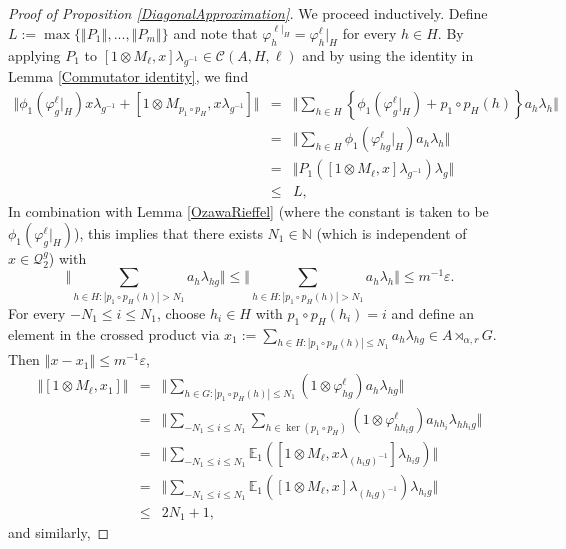 \documentclass[a4paper,11pt,reqno]{amsart}
\numberwithin{equation}{section}
\numberwithin{equation}{section}
\theoremstyle{definition}
\theoremstyle{remark}
\theoremstyle{remark}
\begin{document}
\begin{proof}[{Proof of Proposition \ref{DiagonalApproximation}}]
We proceed inductively. Define $L:=\max\{\left\Vert P_{1}\right\Vert ,...,\left\Vert P_{m}\right\Vert \}$
and note that $\varphi_{h}^{\ell|_{H}}=\varphi_{h}^{\ell}|_{H}$ for
every $h\in H$. By applying $P_{1}$ to $[1\otimes M_{\ell},x]\lambda_{g^{-1}}\in\mathcal{C}(A,H,\ell)$
and by using the identity in Lemma \ref{Commutator identity}, we
find 
\begin{eqnarray}
\nonumber
\Vert\phi_{1}(\varphi_{g}^{\ell}|_{H})x\lambda_{g^{-1}}+[1\otimes M_{p_{1}\circ p_{H}},x\lambda_{g^{-1}}]\Vert &=&  \Vert\sum_{h\in H}\left\{ \phi_{1}(\varphi_{g}^{\ell}|_{H})+p_{1}\circ p_{H}(h)\right\} a_{h}\lambda_{h}\Vert \\
\nonumber
&=& \Vert\sum_{h\in H}\phi_{1}(\varphi_{hg}^{\ell}|_{H})a_{h}\lambda_{h}\Vert \\
\nonumber
&=&   \Vert P_{1}([1\otimes M_{\ell},x]\lambda_{g^{-1}})\lambda_{g}\Vert \\
\nonumber
&\leq&  L,
\end{eqnarray}
In combination with Lemma \ref{OzawaRieffel} (where the constant is taken to be $\phi_{1}(\varphi_{g}^{\ell}|_{H})$), this implies that there
exists $N_{1}\in\mathbb{N}$ (which is independent of $x\in\mathcal{Q}_{2}^{g}$)
with 
\[
\Vert\sum_{h\in H:\left|p_{1}\circ p_{H}(h)\right|>N_{1}}a_{h}\lambda_{hg}\Vert\leq\Vert\sum_{h\in H:\left|p_{1}\circ p_{H}(h)\right|>N_{1}}a_{h}\lambda_{h}\Vert\leq m^{-1}\varepsilon.
\]
For every $-N_{1}\leq i\leq N_{1}$, choose $h_{i}\in H$ with $p_{1}\circ p_{H}(h_{i})=i$
and define an element in the crossed product via $x_{1}:=\sum_{h\in H:\left|p_{1}\circ p_{H}(h)\right|\leq N_{1}}a_{h}\lambda_{hg}\in A\rtimes_{\alpha,r}G$.
Then $\left\Vert x-x_{1}\right\Vert \leq m^{-1}\varepsilon$, 
\begin{eqnarray*}
\Vert[1\otimes M_{\ell},x_{1}]\Vert & = & \Vert\sum_{h\in G:\left|p_{1}\circ p_{H}(h)\right|\leq N_{1}}(1\otimes\varphi_{hg}^{\ell})a_{h}\lambda_{hg}\Vert\\
 & = & \Vert\sum_{-N_{1}\leq i\leq N_{1}}\sum_{h\in\ker(p_{1}\circ p_{H})}(1\otimes\varphi_{hh_{i}g}^{\ell})a_{hh_{i}}\lambda_{hh_{i}g}\Vert\\
&=& \Vert\sum_{-N_{1}\leq i\leq N_{1}}\mathbb{E}_{1}([1\otimes M_{\ell},x\lambda_{(h_{i}g)^{-1}}]\lambda_{h_{i}g})\Vert \\
 & = & \Vert\sum_{-N_{1}\leq i\leq N_{1}}\mathbb{E}_{1}([1\otimes M_{\ell},x]\lambda_{(h_{i}g)^{-1}})\lambda_{h_{i}g}\Vert\\
 & \leq & 2N_{1}+1,
\end{eqnarray*}
and similarly,

\end{proof}
\end{document}
